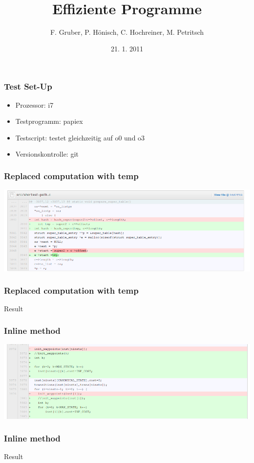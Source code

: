 \documentclass{beamer}
\title{Effiziente Programme}
\author{F. Gruber, P. H\"onisch, C. Hochreiner, M. Petritsch}
\date{21. 1. 2011}
\begin{document}
\frame{\titlepage}

\begin{frame}\frametitle{Test Set-Up}
\begin{itemize}
  \item Prozessor: i7
  \item Testprogramm: papiex
  \item Testscript: testet gleichzeitig auf o0 und o3
  \item Versionskontrolle: git
\end{itemize}
\end{frame}

\begin{frame}\frametitle{Replaced computation with temp}
\begin{center}
\includegraphics[scale=0.4]{shots/rcwt.png}
\end{center}
\end{frame}

\begin{frame}\frametitle{Replaced computation with temp}
\begin{center}
Result
\end{center}
\end{frame}

\begin{frame}\frametitle{Inline method}
\begin{center}
\includegraphics[scale=0.4]{shots/inline.png}
\end{center}
\end{frame}

\begin{frame}\frametitle{Inline method}
\begin{center}
Result
\end{center}
\end{frame}
\end{document}
